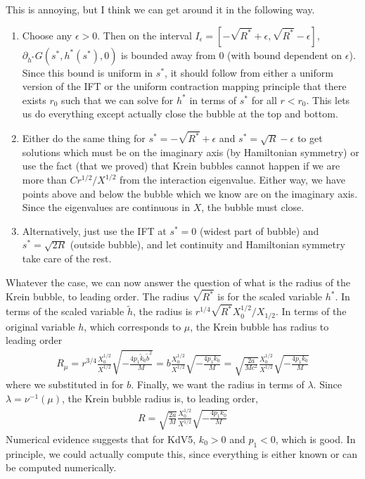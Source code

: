 \documentclass[thesis.tex]{subfiles}
\begin{document}
This is annoying, but I think we can get around it in the following way.
\begin{enumerate}
\item Choose any $\epsilon > 0$. Then on the interval $I_\epsilon = [-\sqrt{R^*} + \epsilon, \sqrt{R^*} - \epsilon]$, $\partial_{h^*} G(s^*, h^*(s^*), 0)$ is bounded away from 0 (with bound dependent on $\epsilon$). Since this bound is uniform in $s^*$, it should follow from either a uniform version of the IFT or the uniform contraction mapping principle that there exists $r_0$ such that we can solve for $h^*$ in terms of $s^*$ for all $r < r_0$. This lets us do everything except actually close the bubble at the top and bottom.

\item Either do the same thing for $s^* = -\sqrt{R^*} + \epsilon$ and $s^* = \sqrt{R} - \epsilon$ to get solutions which must be on the imaginary axis (by Hamiltonian symmetry) or use the fact (that we proved) that Krein bubbles cannot happen if we are more than $C r^{1/2}/X^{1/2}$ from the interaction eigenvalue. Either way, we have points above and below the bubble which we know are on the imaginary axis. Since the eigenvalues are continuous in $X$, the bubble must close.

\item Alternatively, just use the IFT at $s^* = 0$ (widest part of bubble) and $s^* = \sqrt{2R}$ (outside bubble), and let continuity and Hamiltonian symmetry take care of the rest.

\end{enumerate} 

Whatever the case, we can now answer the question of what is the radius of the Krein bubble, to leading order. The radius $\sqrt{R^*}$ is for the scaled variable $h^*$. In terms of the scaled variable $\tilde{h}$, the radius is $r^{1/4} \sqrt{R^*} X_0^{1/2}/X_{1/2}$. In terms of the original variable $h$, which corresponds to $\mu$, the Krein bubble has radius to leading order
\begin{align*}
R_\mu = r^{3/4}\frac{X_0^{1/2}}{X^{1/2}} \sqrt{-\frac{4 p_1 \tilde{k}_0 \tilde{b}^2 }{M}} = b \frac{X_0^{1/2}}{X^{1/2}} \sqrt{-\frac{4 p_1 k_0 }{M}} 
= \sqrt{ \frac{2a}{M c^2} }  \frac{X_0^{1/2}}{X^{1/2}} \sqrt{-\frac{4 p_1 k_0 }{M}} 
\end{align*}
where we substituted in for $b$. Finally, we want the radius in terms of $\lambda$. Since $\lambda = \nu^{-1}(\mu)$, the Krein bubble radius is, to leading order,
\begin{align*}
R = \sqrt{ \frac{2a}{M} }  \frac{X_0^{1/2}}{X^{1/2}} \sqrt{-\frac{4 p_1 k_0 }{M}} 
\end{align*}
Numerical evidence suggests that for KdV5, $k_0 > 0$ and $p_1 < 0$, which is good. In principle, we could actually compute this, since everything is either known or can be computed numerically.
\end{document}

